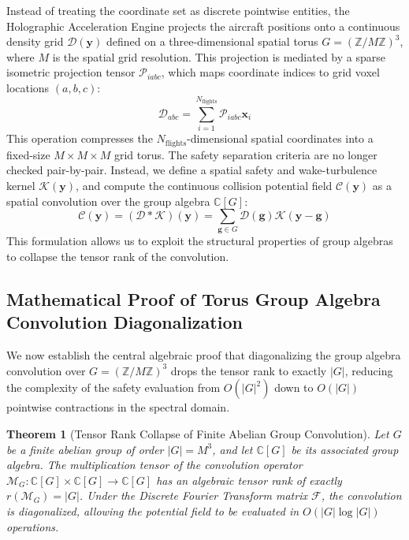 \documentclass[11pt,a4paper]{book}
\newtheorem{theorem}{Theorem}
\begin{document}
Instead of treating the coordinate set as discrete pointwise entities, the Holographic Acceleration Engine projects the aircraft positions onto a continuous density grid $\mathcal{D}(\mathbf{y})$ defined on a three-dimensional spatial torus $G = (\mathbb{Z}/M\mathbb{Z})^3$, where $M$ is the spatial grid resolution. This projection is mediated by a sparse isometric projection tensor $\mathcal{P}_{iabc}$, which maps coordinate indices to grid voxel locations $(a, b, c)$:
\begin{equation}
\label{eq:density_projection}
\mathcal{D}_{abc} = \sum_{i=1}^{N_{\text{flights}}} \mathcal{P}_{iabc} \mathbf{x}_i
\end{equation}
This operation compresses the $N_{\text{flights}}$-dimensional spatial coordinates into a fixed-size $M \times M \times M$ grid torus. The safety separation criteria are no longer checked pair-by-pair. Instead, we define a spatial safety and wake-turbulence kernel $\mathcal{K}(\mathbf{y})$, and compute the continuous collision potential field $\mathcal{C}(\mathbf{y})$ as a spatial convolution over the group algebra $\mathbb{C}[G]$:
\begin{equation}
\label{eq:convolution_integral}
\mathcal{C}(\mathbf{y}) = (\mathcal{D} * \mathcal{K})(\mathbf{y}) = \sum_{\mathbf{g} \in G} \mathcal{D}(\mathbf{g}) \mathcal{K}(\mathbf{y} - \mathbf{g})
\end{equation}
This formulation allows us to exploit the structural properties of group algebras to collapse the tensor rank of the convolution. 

\subsection{Mathematical Proof of Torus Group Algebra Convolution Diagonalization}\label{subsec:convolution_proof}

We now establish the central algebraic proof that diagonalizing the group algebra convolution over $G = (\mathbb{Z}/M\mathbb{Z})^3$ drops the tensor rank to exactly $\lvert G \rvert$, reducing the complexity of the safety evaluation from $O(\lvert G \rvert^2)$ down to $O(\lvert G \rvert)$ pointwise contractions in the spectral domain.

\begin{theorem}[Tensor Rank Collapse of Finite Abelian Group Convolution]
Let $G$ be a finite abelian group of order $\lvert G \rvert = M^3$, and let $\mathbb{C}[G]$ be its associated group algebra. The multiplication tensor of the convolution operator $\mathcal{M}_G: \mathbb{C}[G] \times \mathbb{C}[G] \to \mathbb{C}[G]$ has an algebraic tensor rank of exactly $r(\mathcal{M}_G) = \lvert G \rvert$. Under the Discrete Fourier Transform matrix $\mathcal{F}$, the convolution is diagonalized, allowing the potential field to be evaluated in $O(\lvert G \rvert \log \lvert G \rvert)$ operations.
\end{theorem}
\end{document}
